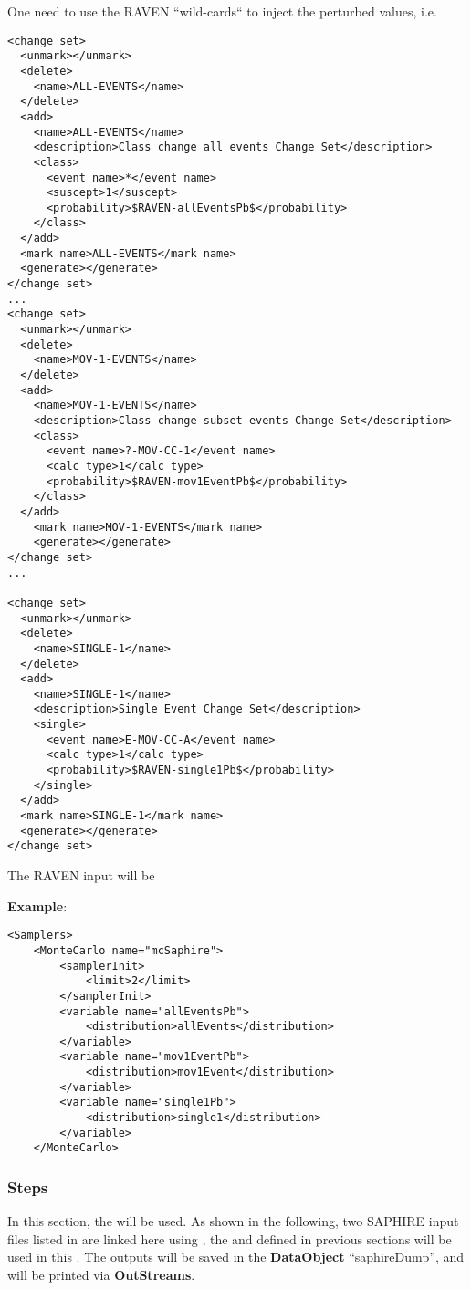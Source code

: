 One need to use the RAVEN ``wild-cards`` to inject the perturbed values, i.e.
\begin{lstlisting}[style=XML]
<change set>
  <unmark></unmark>
  <delete>
    <name>ALL-EVENTS</name>
  </delete>
  <add>
    <name>ALL-EVENTS</name>
    <description>Class change all events Change Set</description>
    <class>
      <event name>*</event name>
      <suscept>1</suscept>
      <probability>$RAVEN-allEventsPb$</probability>
    </class>
  </add>
  <mark name>ALL-EVENTS</mark name>
  <generate></generate>
</change set>
...
<change set>
  <unmark></unmark>
  <delete>
    <name>MOV-1-EVENTS</name>
  </delete>
  <add>
    <name>MOV-1-EVENTS</name>
    <description>Class change subset events Change Set</description>
    <class>
      <event name>?-MOV-CC-1</event name>
      <calc type>1</calc type>
      <probability>$RAVEN-mov1EventPb$</probability>
    </class>
  </add>
    <mark name>MOV-1-EVENTS</mark name>
    <generate></generate>
</change set>
...

<change set>
  <unmark></unmark>
  <delete>
    <name>SINGLE-1</name>
  </delete>
  <add>
    <name>SINGLE-1</name>
    <description>Single Event Change Set</description>
    <single>
      <event name>E-MOV-CC-A</event name>
      <calc type>1</calc type>
      <probability>$RAVEN-single1Pb$</probability>
    </single>
  </add>
  <mark name>SINGLE-1</mark name>
  <generate></generate>
</change set>
\end{lstlisting}

The RAVEN  input will be

\textbf{Example}:
\begin{lstlisting}[style=XML]
  <Samplers>
    <MonteCarlo name="mcSaphire">
        <samplerInit>
            <limit>2</limit>
        </samplerInit>
        <variable name="allEventsPb">
            <distribution>allEvents</distribution>
        </variable>
        <variable name="mov1EventPb">
            <distribution>mov1Event</distribution>
        </variable>
        <variable name="single1Pb">
            <distribution>single1</distribution>
        </variable>
    </MonteCarlo>
\end{lstlisting}

\subsubsection{Steps}
In this section, the  will be used. As shown in the following, two SAPHIRE
input files listed in  are linked here using , the 
and  defined in previous sections will be used in this . The
outputs will be saved in the \textbf{DataObject} ``saphireDump'', and will be printed via
\textbf{OutStreams}.

